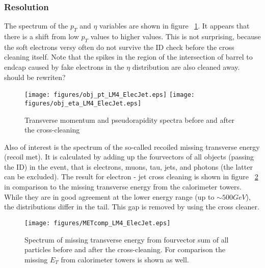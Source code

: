 \documentclass{cmspaper}
\begin{document}
\subsubsection{Resolution}


The spectrum of the \(p_T\) and \(\eta\) variables are shown in figure ~\ref{fig:objSpectra_ElecJet}. It appears that there is a shift from low \(p_T\) values to higher values. This is not surprising, because the soft electrons versy often do not survive the ID check before the cross cleaning itself. Note that the spikes in the region of the intersection of barrel to endcap caused by fake electrons in the \(\eta\) distribution are also cleaned away. {\color{red}should be rewriten?}\\

\begin{figure}[hb]
\begin{center}
    \texttt{[image: figures/obj\_pt\_LM4\_ElecJet.eps]}
    \texttt{[image: figures/obj\_eta\_LM4\_ElecJet.eps]}
    \caption{Transverse momentum and pseudorapidity spectra before
    and after the cross-cleaning}
\label{fig:objSpectra_ElecJet}
\end{center}
\end{figure}

Also of interest is the spectrum of the so-called recoiled missing transverse energy (recoil met). It is calculated by adding up the fourvectors of all objects (passing the ID) in the event, that is electrons, muons, tau, jets, and photons (the latter can be excluded). The result for electron - jet cross cleaning is shown in figure ~\ref{fig:met_ElecJet} in comparison to the missing transverse energy from the calorimeter towers. While they are in good agreement at the lower energy range (up to \(\sim 500 GeV\)), the distributions differ in the tail. This gap is removed by using the cross cleaner.

\begin{figure}[hb]
\begin{center}
    \texttt{[image: figures/METcomp\_LM4\_ElecJet.eps]}
    \caption{Spectrum of missing transverse energy from fourvector sum of all
    particles before and after the cross-cleaning. For comparison the missing
    $E_T$ from calorimeter towers is shown as well.}
\label{fig:met_ElecJet}
\end{center}
\end{figure}
\end{document}
